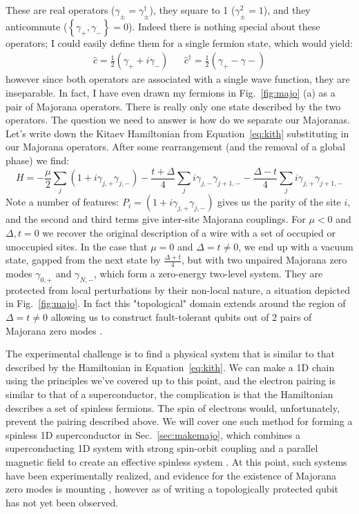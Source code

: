 These are real operators ($\gamma_\pm = \gamma_\pm^\dagger$), they square to 1 ($\gamma_\pm^2 = 1$), and they anticommute ($\left\{\gamma_+, \gamma_-\right\} = 0$).
Indeed there is nothing special about these operators; I could easily define them for a single fermion state, which would yield:
\begin{align}
  \hat c = \frac{1}{2}(\gamma_{+} + i\gamma_{-}) && \hat c^\dagger = \frac{1}{2}(\gamma_{+} - \gamma{-})
\end{align}
however since both operators are associated with a single wave function, they are inseparable. In fact, I have even drawn my fermions in Fig.~\ref{fig:majo} (a) as a
pair of Majorana operators. There is really only one state described by the two operators.
The question we need to answer is how do we separate our Majoranas. Let's write down the Kitaev Hamiltonian from Equation~\ref{eq:kith}
substituting in our Majorana operators. After some rearrangement (and the removal of a global phase) we find:
\begin{equation}
  H = -\frac{\mu}{2}\sum_j(1 + i\gamma_{j,+}\gamma_{j,-}) - \frac{t + \Delta}{4}\sum_j i \gamma_{j,-}\gamma_{j+1,-} - \frac{\Delta - t}{4}\sum_j i \gamma_{j,+}\gamma_{j+1,-}
\end{equation}
Note a number of features: $P_i = (1 + i\gamma_{j,+}\gamma_{j,-})$ gives us the parity of the site $i$, and the second and third terms give inter-site Majorana couplings.
For $\mu < 0$ and $\Delta, t = 0$ we recover the original description of a wire with a set of occupied or unoccupied sites. In the case
that $\mu = 0$ and $\Delta = t \neq 0$, we end up with a vacuum state, gapped from the next state by $\tfrac{\Delta+t}{4}$, but with two unpaired
Majorana zero modes $\gamma_{0,+}$ and $\gamma_{N,-}$, which form a zero-energy two-level system. They are protected from local perturbations
by their non-local nature, a situation depicted in Fig.~\ref{fig:majo}. In fact this "topological" domain extends around the region of $\Delta = t \neq 0$
allowing us to construct fault-tolerant qubits out of 2 pairs of Majorana zero modes \cite{RevModPhys.80.1083}.

The experimental challenge is to find a physical system that is similar to that described by the Hamiltonian in Equation~\ref{eq:kith}. We can make a 1D chain using the principles
we've covered up to this point, and the electron pairing is similar to that of a superconductor, the complication is that the Hamiltonian describes
a set of spinless fermions. The spin of electrons would, unfortunately, prevent the pairing described above. We will cover one such method for forming
a spinless 1D superconductor in Sec.~\ref{sec:makemajo}, which combines a superconducting 1D system with strong spin-orbit coupling and a
parallel magnetic field to create an effective spinless system \cite{PhysRevLett.105.077001,PhysRevLett.105.177002}. At this point, such systems
have been experimentally realized, and evidence for the existence of Majorana zero modes is mounting \cite{Mourik1003,s41578-018-0003-1}, however as of writing
a topologically protected qubit has not yet been observed.


